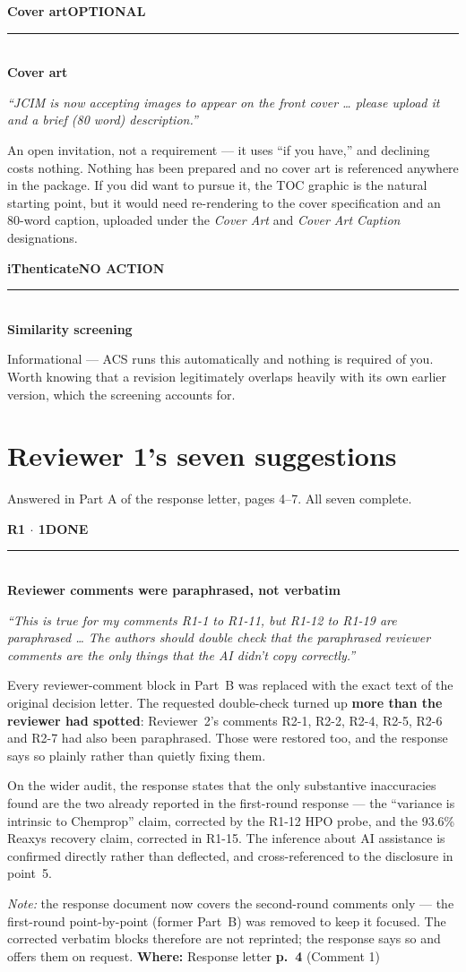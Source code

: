 \documentclass[11pt]{article}
\newcommand{\itemhead}[4]{%
  \needspace{4\baselineskip}%
  \vspace{0.5em}%
  {\bfseries\color{accent}#1}\hfill{\small\bfseries\color{#3}\MakeUppercase{#2}}\\[-0.4em]
  \textcolor{rulegrey}{\rule{\linewidth}{0.4pt}}\\[-0.2em]
  {\bfseries #4}\par\vspace{-0.15em}%
}
\newcommand{\quo}[1]{{\small\itshape\color{inkmute}``#1''}\par}
\newcommand{\where}[1]{%
  \vspace{0.15em}%
  {\small\textcolor{inkmute}{\textbf{Where:}} #1}\par
}
\begin{document}
\itemhead{Cover art}{optional}{act}{Cover art}
\quo{JCIM is now accepting images to appear on the front cover \ldots{} please upload it and a brief (80 word) description.}
An open invitation, not a requirement --- it uses ``if you have,'' and declining costs nothing. Nothing has
been prepared and no cover art is referenced anywhere in the package. If you did want to pursue it, the TOC
graphic is the natural starting point, but it would need re-rendering to the cover specification and an
80-word caption, uploaded under the \emph{Cover Art} and \emph{Cover Art Caption} designations.

\itemhead{iThenticate}{no action}{inkmute}{Similarity screening}
Informational --- ACS runs this automatically and nothing is required of you. Worth knowing that a revision
legitimately overlaps heavily with its own earlier version, which the screening accounts for.

\section{Reviewer 1's seven suggestions}
{\small\color{inkmute} Answered in Part A of the response letter, pages 4--7. All seven complete.}

\itemhead{R1 $\cdot$ 1}{done}{done}{Reviewer comments were paraphrased, not verbatim}
\quo{This is true for my comments R1-1 to R1-11, but R1-12 to R1-19 are paraphrased \ldots{} The authors should double check that the paraphrased reviewer comments are the only things that the AI didn't copy correctly.}
Every reviewer-comment block in Part~B was replaced with the exact text of the original decision letter.
The requested double-check turned up \textbf{more than the reviewer had spotted}: Reviewer~2's comments
R2-1, R2-2, R2-4, R2-5, R2-6 and R2-7 had also been paraphrased. Those were restored too, and the response
says so plainly rather than quietly fixing them.

On the wider audit, the response states that the only substantive inaccuracies found are the two already
reported in the first-round response --- the ``variance is intrinsic to Chemprop'' claim, corrected by the
R1-12 HPO probe, and the 93.6\% Reaxys recovery claim, corrected in R1-15. The inference about AI
assistance is confirmed directly rather than deflected, and cross-referenced to the disclosure in point~5.

\textit{Note:} the response document now covers the second-round comments only --- the first-round
point-by-point (former Part~B) was removed to keep it focused. The corrected verbatim blocks therefore
are not reprinted; the response says so and offers them on request.
\where{Response letter \textbf{p.~4} (Comment 1)}
\end{document}
